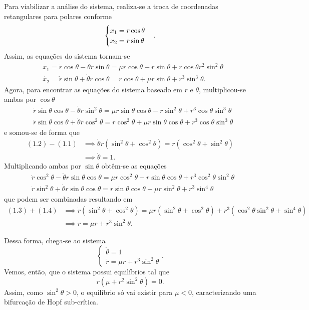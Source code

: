 \documentclass[a4paper]{report}
\begin{document}
Para viabilizar a análise do sistema, realiza-se a troca de coordenadas retangulares para polares conforme \[
    \begin{cases}
        x_1 = r\cos\theta \\
	x_2 = r\sin\theta
    \end{cases} \\
.\] Assim, as equações do sistema tornam-se 
\begin{align*}
    &\dot{x_1} = \dot{r}\cos\theta -\dot{\theta}r\sin\theta = \mu r\cos\theta - r\sin\theta +r\cos\theta r^2\sin^2\theta \\
    &\dot{x_2} = \dot{r}\sin\theta + \dot{\theta}r\cos\theta = r\cos\theta + \mu r\sin\theta + r^3\sin^3\theta
.\end{align*}
Agora, para encontrar as equações do sistema baseado em $r$ e $\theta$, multiplicou-se ambas por $\cos\theta$
\begin{align}
    & \dot{r}\sin\theta \cos\theta - \dot{\theta}r\sin^2\theta = \mu r\sin\theta\cos\theta -r\sin^2\theta + r^3\cos\theta\sin^3\theta \\
    & \dot{r}\sin\theta\cos\theta + \dot{\theta}r\cos^2\theta = r\cos^2\theta + \mu r\sin\theta \cos\theta + r^3\cos\theta\sin^3\theta
\end{align}
e somou-se de forma que
\begin{align*}
    (1.2) - (1.1) &\implies \dot{\theta}r \left( \sin^2\theta + \cos^2\theta \right) = r\left( \cos^2\theta + \sin^2\theta \right) \\
	      &\implies \dot{\theta} = 1
.\end{align*}
Multiplicando ambas por $\sin\theta$ obtêm-se as equações
\begin{align}
    & \dot{r}\cos^2\theta -\dot{\theta}r \sin\theta\cos\theta = \mu r \cos^2\theta - r\sin\theta\cos\theta + r^3\cos^2\theta\sin^2\theta \\
    & \dot{r}\sin^2\theta + \dot{\theta}r \sin\theta\cos\theta = r\sin\theta\cos\theta + \mu r \sin^2\theta + r^3\sin ^{4}\theta
\end{align}
que podem ser combinadas resultando em
\begin{align*}
    (1.3) + (1.4) &\implies \dot{r}\left( \sin^2\theta + \cos^2\theta \right) = \mu r \left( \sin^2\theta + \cos^2\theta \right) + r^3\left( \cos^2\theta\sin^2\theta + \sin^4\theta \right) \\
	      &\implies \dot{r} = \mu r + r^3\sin^2\theta
.\end{align*}

Dessa forma, chega-se ao sistema \[
\begin{cases}
    \dot{\theta} = 1 \\
    \dot{r} = \mu r + r^3\sin^2\theta
\end{cases}
.\] Vemos, então, que o sistema possui equilíbrios tal que \[
r \left( \mu + r^2\sin^2\theta \right)  = 0
.\] Assim, como $\sin^2\theta > 0$, o equilíbrio só vai existir para $\mu<0$, caracterizando uma bifurcação de Hopf sub-crítica.
\end{document}

